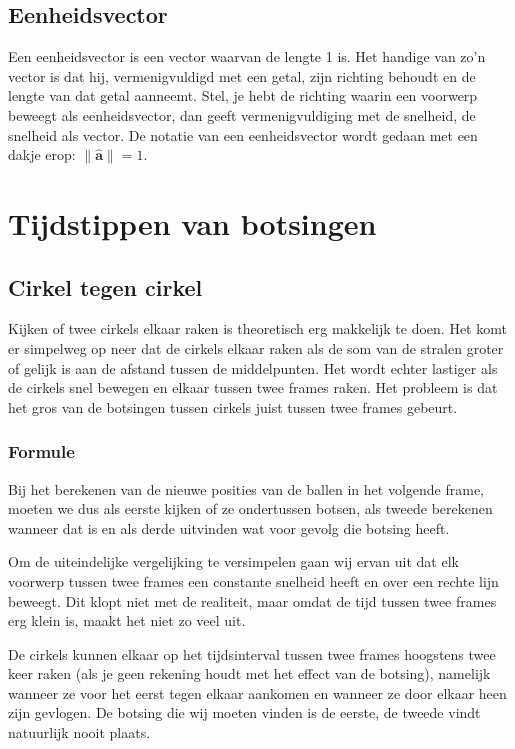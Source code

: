 \documentclass[12pt,a4paper]{article}
\begin{document}
	\subsection{Eenheidsvector}
	Een eenheidsvector is een vector waarvan de lengte 1 is. Het handige van zo'n vector is dat hij, vermenigvuldigd met een getal, zijn richting behoudt en de lengte van dat getal aanneemt. Stel, je hebt de richting waarin een voorwerp beweegt als eenheidsvector, dan geeft vermenigvuldiging met de snelheid, de snelheid als vector. De notatie van een eenheidsvector wordt gedaan met een dakje erop: $\|\mathbf{\hat{a}}\| = 1$.

	\newpage	

	\section{Tijdstippen van botsingen}
	
	\subsection{Cirkel tegen cirkel}
	Kijken of twee cirkels elkaar raken is theoretisch erg makkelijk te doen. Het komt er simpelweg op neer dat de cirkels elkaar raken als de som van de stralen groter of gelijk is aan de afstand tussen de middelpunten. Het wordt echter lastiger als de cirkels snel bewegen en elkaar tussen twee frames raken. Het probleem is dat het gros van de botsingen tussen cirkels juist tussen twee frames gebeurt.
	
	\subsubsection{Formule}
	Bij het berekenen van de nieuwe posities van de ballen in het volgende frame, moeten we dus als eerste kijken of ze ondertussen botsen, als tweede berekenen wanneer dat is en als derde uitvinden wat voor gevolg die botsing heeft.
	
	Om de uiteindelijke vergelijking te versimpelen gaan wij ervan uit dat elk voorwerp tussen twee frames een constante snelheid heeft en over een rechte lijn beweegt. Dit klopt niet met de realiteit, maar omdat de tijd tussen twee frames erg klein is, maakt het niet zo veel uit.
	
	De cirkels kunnen elkaar op het tijdsinterval tussen twee frames hoogstens twee keer raken (als je geen rekening houdt met het effect van de botsing), namelijk wanneer ze voor het eerst tegen elkaar aankomen en wanneer ze door elkaar heen zijn gevlogen. De botsing die wij moeten vinden is de eerste, de tweede vindt natuurlijk nooit plaats.
	
\end{document}

